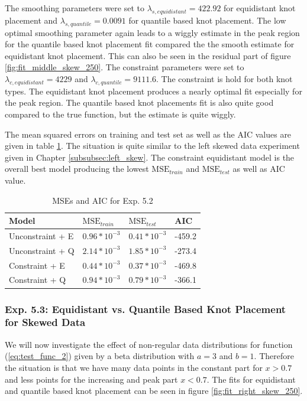 \documentclass[10pt,a4paper]{article}
\begin{document}
The smoothing parameters were set to $\lambda_{s, equidistant} = 422.92$ for equidistant knot placement and $\lambda_{s, quantile} = 0.0091$ for quantile based knot placement. The low optimal smoothing parameter again leads to a wiggly estimate in the peak region for the quantile based knot placement fit compared the the smooth estimate for equidistant knot placement. This can also be seen in the residual part of figure \ref{fig:fit_middle_skew_250}. The constraint parameters were set to $\lambda_{c, equidistant} = 4229$ and $\lambda_{c, quantile} = 9111.6$. The constraint is hold for both knot types. The equidistant knot placement produces a nearly optimal fit especially for the peak region. The quantile based knot placements fit is also quite good compared to the true function, but the estimate is quite wiggly.

The mean squared errors on training and test set as well as the AIC values are given in table \ref{tab:metrics_52}. The situation is quite similar to the left skewed data experiment given in Chapter \ref{subsubsec:left_skew}. The constraint equidistant model is the overall best model producing the lowest $\text{MSE}_{train}$ and $\text{MSE}_{test}$ as well as AIC value.

\begin{table}[H]
	\centering
	\begin{tabular}{|l|l|l|l|}
		\hline
		\textbf{Model} & \textbf{$\text{MSE}_{train}$} & \textbf{$\text{MSE}_{test}$}  & \textbf{AIC} \\ \hline \toprule
		Unconstraint + E  & $0.96 * 10^{-3}$  & $0.41 * 10^{-3}$ & -459.2       \\ \hline
		Unconstraint + Q  & $2.14 * 10^{-3}$  & $1.85 * 10^{-3}$ & -273.4       \\ \hline
		Constraint + E    & $0.44 * 10^{-3}$  & $0.37 * 10^{-3}$ & -469.8       \\ \hline
		Constraint + Q    & $0.94 * 10^{-3}$  & $0.79 * 10^{-3}$ & -366.1      \\ \hline \bottomrule
	\end{tabular}
	\caption{MSEs and AIC for Exp. 5.2}
	\label{tab:metrics_52}
\end{table}


\subsubsection{Exp. 5.3: Equidistant vs. Quantile Based Knot Placement for Skewed Data}

We will now investigate the effect of non-regular data distributions for function (\ref{eq:test_func_2}) given by a beta distribution with $a = 3$ and $b = 1$. Therefore the situation is that we have many data points in the constant part for $x > 0.7$ and less points for the increasing and peak part $x < 0.7$. The fits for equidistant and quantile based knot placement can be seen in figure \ref{fig:fit_right_skew_250}. 
\end{document}
